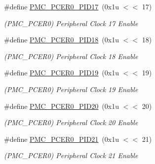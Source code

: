 \begin{DoxyCompactItemize}
\mbox{\label{group__SAMV71__PMC_gae1740051655ee2a6807a4d3cb76dfedf}} 
\#define \mbox{\hyperlink{group__SAMV71__PMC_gae1740051655ee2a6807a4d3cb76dfedf}{P\+M\+C\+\_\+\+P\+C\+E\+R0\+\_\+\+P\+I\+D17}}~(0x1u $<$$<$ 17)
\begin{DoxyCompactList}\small\item\em (P\+M\+C\+\_\+\+P\+C\+E\+R0) Peripheral Clock 17 Enable \end{DoxyCompactList}\item 
\mbox{\label{group__SAMV71__PMC_ga26ffd6621b0af52c4472d3c36e446cd5}} 
\#define \mbox{\hyperlink{group__SAMV71__PMC_ga26ffd6621b0af52c4472d3c36e446cd5}{P\+M\+C\+\_\+\+P\+C\+E\+R0\+\_\+\+P\+I\+D18}}~(0x1u $<$$<$ 18)
\begin{DoxyCompactList}\small\item\em (P\+M\+C\+\_\+\+P\+C\+E\+R0) Peripheral Clock 18 Enable \end{DoxyCompactList}\item 
\mbox{\label{group__SAMV71__PMC_ga5abd1e01358b05a90ad9b9adbe752b8a}} 
\#define \mbox{\hyperlink{group__SAMV71__PMC_ga5abd1e01358b05a90ad9b9adbe752b8a}{P\+M\+C\+\_\+\+P\+C\+E\+R0\+\_\+\+P\+I\+D19}}~(0x1u $<$$<$ 19)
\begin{DoxyCompactList}\small\item\em (P\+M\+C\+\_\+\+P\+C\+E\+R0) Peripheral Clock 19 Enable \end{DoxyCompactList}\item 
\mbox{\label{group__SAMV71__PMC_gaa43417148b073c33fb18fd616349c2b5}} 
\#define \mbox{\hyperlink{group__SAMV71__PMC_gaa43417148b073c33fb18fd616349c2b5}{P\+M\+C\+\_\+\+P\+C\+E\+R0\+\_\+\+P\+I\+D20}}~(0x1u $<$$<$ 20)
\begin{DoxyCompactList}\small\item\em (P\+M\+C\+\_\+\+P\+C\+E\+R0) Peripheral Clock 20 Enable \end{DoxyCompactList}\item 
\mbox{\label{group__SAMV71__PMC_ga9218ee3952c7faf08fcf57dcdb048dc4}} 
\#define \mbox{\hyperlink{group__SAMV71__PMC_ga9218ee3952c7faf08fcf57dcdb048dc4}{P\+M\+C\+\_\+\+P\+C\+E\+R0\+\_\+\+P\+I\+D21}}~(0x1u $<$$<$ 21)
\begin{DoxyCompactList}\small\item\em (P\+M\+C\+\_\+\+P\+C\+E\+R0) Peripheral Clock 21 Enable \end{DoxyCompactList}\item 
$$
\end{DoxyCompactItemize}
